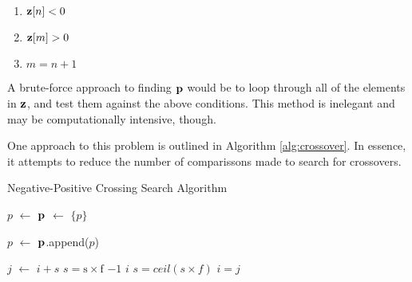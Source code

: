 \begin{enumerate}
    \centering
    \item  \parbox{0.5\linewidth}{$\bm{\mathrm{z}}[n] < 0$ }
    \item  $\bm{\mathrm{z}}[m] > 0$ 
    \item $m = n+1$
\end{enumerate}

A brute-force approach to finding $\bm{\mathrm{p}}$ would be to loop through all of the
elements in $\bm{\mathrm{z}}$, and test them against the above conditions. This method
is inelegant and may be computationally intensive, though.

One approach to this problem is outlined in Algorithm \ref{alg:crossover}. In
essence, it attempts to reduce the number of comparissons made to search for
crossovers. 


\newcommand*\Let[2]{\State #1 $\gets$ #2}

\begin{algorithm}[h] 
    \caption{Negative-Positive Crossing Search Algorithm} 
    \label{alg:crossover}
    \begin{algorithmic}[1] 

	    \Let{$p$}{} 
	    \Let{$\bm{\mathrm{p}}$}{$\{ p \}$}

		\Let{$p$}{}
		 \State
		$\bm{\mathrm{p}}$.append($p$) \EndWhile 
		\State \Return {}
	\EndFunction

	\State

	\Let{$j$}{$i+s$}
	\If{$j > length(\se{z})$} 
	    \State $s = \mathrm{s \times f}$  
	    \State \Return $-1$	  
	    \State \Return $i$ 
	    \Else
		\State $s = ceil(s \times f)$
	    \EndIf
	\Else
	    \State $i=j$
	\EndIf
	\State \Return {}
	\EndFunction 
    \end{algorithmic} 
\end{algorithm}






















